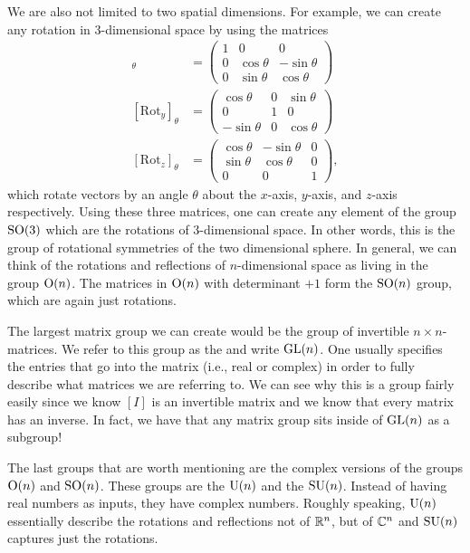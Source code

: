             We are also not limited to two spatial dimensions.  For example, we can create any rotation in 3-dimensional space by using the matrices
            \begin{align*}
                [\mathrm{Rot}_x]_\theta &= \begin{pmatrix} 1 & 0 & 0 \\ 0 & \cos\theta & -\sin \theta \\ 0 & \sin\theta & \cos \theta \end{pmatrix}\\
    [\mathrm{Rot}_y]_\theta &= \begin{pmatrix} \cos \theta & 0 & \sin \theta \\ 0 & 1 & 0 \\ -\sin \theta & 0 & \cos \theta \end{pmatrix}\\
    [\mathrm{Rot}_z]_\theta &= \begin{pmatrix} \cos \theta & -\sin \theta & 0 \\ \sin \theta & \cos \theta  & 0 \\ 0 & 0 & 1 \end{pmatrix},
            \end{align*}
            which rotate vectors by an angle $\theta$ about the $x$-axis, $y$-axis, and $z$-axis respectively.  Using these three matrices, one can create any element of the group $\mathrm{SO}(3)$ which are the rotations of 3-dimensional space. In other words, this is the group of rotational symmetries of the two dimensional sphere. In general, we can think of the rotations and reflections of $n$-dimensional space as living in the group $\mathrm{O}(n)$. The matrices in $\mathrm{O}(n)$ with determinant $+1$ form the $\mathrm{SO}(n)$ group, which are again just rotations.
            
            The largest matrix group we can create would be the group of invertible $n\times n$-matrices.  We refer to this group as the  and write $\mathrm{GL}(n)$.  One usually specifies the entries that go into the matrix (i.e., real or complex) in order to fully describe what matrices we are referring to.  We can see why this is a group fairly easily since we know $[I]$ is an invertible matrix and we know that every matrix has an inverse.  In fact, we have that any matrix group sits inside of $\mathrm{GL}(n)$ as a subgroup! 
            
            The last groups that are worth mentioning are the complex versions of the groups $\mathrm{O}(n)$ and $\mathrm{SO}(n)$. These groups are the  $\mathrm{U}(n)$ and the  $\mathrm{SU}(n)$. Instead of having real numbers as inputs, they have complex numbers. Roughly speaking, $\mathrm{U}(n)$ essentially describe the rotations and reflections not of $\mathbb{R}^n$, but of $\mathbb{C}^n$ and $\mathrm{SU}(n)$ captures just the rotations.  
            
